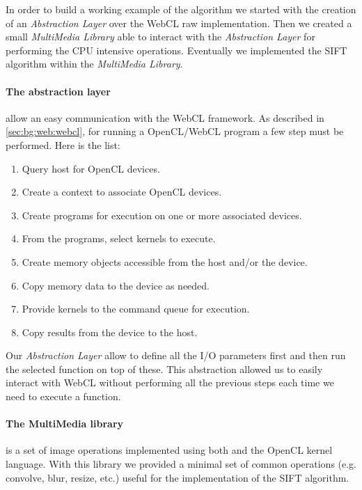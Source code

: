In order to build a working example of the algorithm we started with the creation
of an \emph{Abstraction Layer} over the \ac{WebCL} raw implementation. Then we created
a small \emph{MultiMedia Library} able to interact with the \emph{Abstraction
Layer} for performing the CPU intensive operations. Eventually we implemented the
\ac{SIFT} algorithm within the \emph{MultiMedia Library}.

\paragraph{The abstraction layer} allow an easy communication with the \ac{WebCL}
framework. As described in \ref{sec:bg:web:webcl}, for running a OpenCL/WebCL
program a few step must be performed. Here is the list:
\begin{enumerate}
    \item Query host for \ac{OpenCL} devices.
    \item Create a context to associate \ac{OpenCL} devices.
    \item Create programs for execution on one or more associated devices.
    \item From the programs, select kernels to execute.
    \item Create memory objects accessible from the host and/or the device.
    \item Copy memory data to the device as needed.
    \item Provide kernels to the command queue for execution.
    \item Copy results from the device to the host.
\end{enumerate}
\noindent Our \emph{Abstraction Layer} allow to define all the I/O parameters
first and then run the selected  function on top of these. This abstraction
allowed us to easily interact with \ac{WebCL} without performing all the previous
steps each time we need to execute a  function.


\paragraph{The MultiMedia library} is a set of image operations implemented using
both \js{} and the OpenCL kernel language. With this library we provided a minimal
set of common operations (e.g. convolve, blur, resize, etc.) useful for the
implementation of the \ac{SIFT} algorithm.\\

